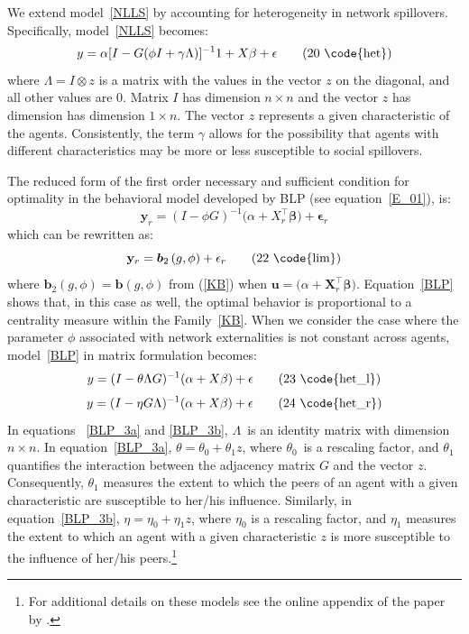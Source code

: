 \documentclass[nojss]{jss}
\begin{document}
We extend model~\ref{NLLS} by accounting for heterogeneity in network spillovers. Specifically, model~\ref{NLLS} becomes:
\begin{equation}
y=\alpha \lbrack I-G(\phi I+\gamma \Lambda )]^{-1}1+X\mathbf{\beta }+\mathbf{\epsilon }   \tag{20 \code{het}}
\label{BP_2}
\end{equation}\setcounter{equation}{20}\noindent 
where $\Lambda =I\otimes z$ is a matrix with the values in the vector $z$ on the diagonal, and all other values are 0. Matrix $I$ has dimension $n \times n$ and the vector $z$ has dimension has dimension $1\times n$. The vector $z$ represents a given characteristic of the agents. Consistently, the term $\gamma$ allows for the possibility that agents with different characteristics may be more or less susceptible to social spillovers.

The reduced form of the first order necessary and sufficient condition for optimality in the behavioral model developed by BLP (see equation~\ref{E_01}), is: 
\begin{equation}
\mathbf{y}_{r}=\left(I-\phi G\right) ^{-1}(\alpha
+X_{r}^\top\mathbf{\beta )}+\mathbf{\epsilon }_{r}
\label{BLP0}
\end{equation}
which can be rewritten as:
\begin{equation}
\mathbf{y}_{r}=\boldsymbol{b}_{2}\left( g,\phi \right)+\mathbf{\epsilon}_{r}  \tag{22 \code{lim}}
\label{BLP}
\end{equation}
where $\boldsymbol{b}_{2}\left( g,\phi \right) =\boldsymbol{b}\left( g,\phi
\right) $ from (\ref{KB}) when $\boldsymbol{u}=(\alpha +\boldsymbol{X}_{r}^\top\mathbf{\beta)}$. Equation~\ref{BLP} shows that, in this case as well, the optimal behavior is proportional to a centrality measure within the Family~\ref{KB}.
When we consider the case where the parameter $\phi$ associated with network externalities is not constant across agents, model~\ref{BLP} in matrix formulation becomes:
\begin{equation}
y=(I-\theta \Lambda G)^{-1}(\alpha +X\mathbf{\beta })+\mathbf{\epsilon} \tag{23 \code{het\_l}}
\label{BLP_3a}
\end{equation}
\begin{equation}
y=(I-\eta G\Lambda)^{-1}(\alpha +X\mathbf{\beta })+\mathbf{\epsilon} \tag{24 \code{het\_r}}
\label{BLP_3b}
\end{equation}
In equations ~\ref{BLP_3a} and \ref{BLP_3b}, $\Lambda $\ is an identity matrix with dimension $n \times n$. In equation~\ref{BLP_3a}, $\theta =\theta _{0}+\theta _{1}z$, where $\theta _{0}$\ is a rescaling factor, and $\theta _{1}$ quantifies the interaction between the adjacency matrix $G$ and the vector $z$. Consequently, $\theta _{1}$ measures the extent to which the peers of an agent with a given characteristic are susceptible to her/his influence. Similarly, in equation~\ref{BLP_3b}, $\eta =\eta _{0}+\eta _{1}z$, where $\eta _{0}$ is a rescaling factor, and $\eta _{1}$ measures the extent to which an agent with a given characteristic $z$ is more susceptible to the influence of her/his peers.\footnote{For additional details on these models see the online appendix of the paper by \cite{Battaglini+Sciabolazza+Patacchini:2020}.}
\end{document}
